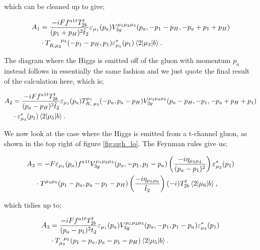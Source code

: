 which can be cleaned up to give;

\begin{equation}
\begin{split}
A_1 &= \frac{-i Ff^{a1t}T^t_{2b}}{(p_1+p_H)^2 \hat{t}_2} \varepsilon_{\mu_1}(p_a)V_{3g}^{\mu_1 \mu_2 \mu_3}(p_a, -p_1-p_H,-p_a+p_1+p_H) \\
&\cdot T_{R, \mu_2}^{\hspace{15pt} \mu_5}(-p_1-p_H, p_1) \varepsilon^*_{\mu_5}(p_1)\mathinner{\langle2\vert\mu_3\vert b\rangle}_{}.
\end{split}
\end{equation}

The diagram where the Higgs is emitted off of the gluon with momentum $p_a$ instead follows in essentially the same fashion and we just quote the final result of the calculation here, which is;

\begin{equation}
\begin{split}
A_2 &=  \frac{-iFf^{a1t}T^t_{2b}}{(p_a-p_H)^2 \hat{t}_2} \varepsilon_{\mu_1}(p_a)T_{R, \hspace{3pt} \mu_3}^{\mu_1}(-p_a,p_a-p_H)V_{3g}^{\mu_3 \mu_4 \mu_5}(p_a-p_H,-p_1,-p_a+p_H+p_1) \\
& \cdot \varepsilon^*_{\mu_4}(p_1)\mathinner{\langle2\vert\mu_5\vert b\rangle}_{}.
\end{split}
\end{equation}

We now look at the case where the Higgs is emitted from a t-channel gluon, as shown in the top right of figure \ref{fig:qgh_lo}. The Feynman rules give us;

\begin{equation}
\begin{split}
A_3 &= -F \varepsilon_{\mu_1}(p_a)f^{a1t}V_{3g}^{\mu_1 \mu_2 \mu_3}(p_a, -p_1, p_1 - p_a) \left(\frac{-i \eta_{\mu_3 \mu_4}}{(p_a-p_1)^2}\right) \varepsilon_{\mu_2}^*(p_1)\\
&\cdot T^{\mu_4 \mu_5}(p_1-p_a,p_a-p_1-p_H)\left(\frac{-i \eta_{\mu_5 \mu_6}}{\hat{t}_2} \right) (-i)T^t_{2b}\mathinner{\langle2\vert\mu_6\vert b\rangle}_{},
\end{split}
\end{equation}

which tidies up to;

\begin{equation}
\begin{split}
A_3 &= \frac{-iF f^{a1t}T^t_{2b}}{(p_a-p_1)^2 t_2} \varepsilon_{\mu_1}(p_a)V_{3g}^{\mu_1 \mu_2 \mu_3}(p_a, -p_1, p_1 - p_a)  \varepsilon_{\mu_2}^*(p_1)\\
& \cdot T_{\mu_3}^{\hspace{5pt}\mu_5}(p_1-p_a,p_a-p_1-p_H) \mathinner{\langle2\vert\mu_5\vert b\rangle}_{}.
\end{split}
\end{equation}

